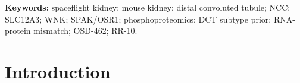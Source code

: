 \documentclass[11pt]{article}
\begin{document}
\begin{abstract}
The spaceflight kidney transcriptome is therefore a tissue-context readout that does not by itself report transporter state; DCT-subtype-resolved or spatial phosphoproteomics, not additional bulk transcriptomics, is a priority next experiment, paired with electrolyte and blood-pressure physiology, to localize and functionally test the suppression.
\end{abstract}

\vspace{0.3em}
\noindent\textbf{Keywords:} spaceflight kidney; mouse kidney; distal convoluted tubule; NCC; SLC12A3; WNK; SPAK/OSR1; phosphoproteomics; DCT subtype prior; RNA-protein mismatch; OSD-462; RR-10.

\clearpage
\tableofcontents
\clearpage

\section{Introduction}
\end{document}
